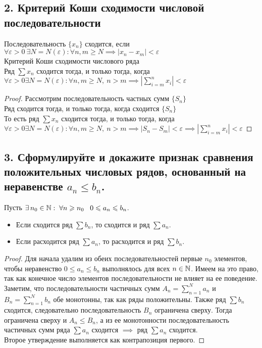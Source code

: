 \documentclass[a4paper, fleqn]{article}
\begin{document}
        \subsection*{2. Критерий Коши сходимости числовой последовательности}
        Последовательность $\{x_n\}$ сходится, если $\forall \varepsilon > 0\ \exists N = N(\varepsilon) : \forall n, m \geqslant N \implies |x_n - x_m| < \varepsilon$\\
        Критерий Коши сходимости числового ряда\\
        Ряд $\sum x_n$ сходится тогда, и только тогда, когда $\forall\varepsilon > 0 \exists N = N(\varepsilon) : \forall n, m \geqslant N,\ n > m \implies |\sum\limits_{i = m}^n x_i| < \varepsilon$
\begin{proof}
        Рассмотрим последовательность частных сумм $\{S_n\}$\\
        Ряд сходится тогда, и только тогда, когда сходится $\{S_n\}$\\
        То есть ряд $\sum x_n$ сходится тогда, и только тогда, когда $\forall \varepsilon > 0 \exists N = N(\varepsilon) : \forall n, m \geqslant N,\ n > m \implies |S_n - S_m| < \varepsilon \implies |\sum\limits_{i = m}^n x_i| < \varepsilon$
\end{proof}

    \subsection*{3. Сформулируйте и докажите признак сравнения положительных числовых рядов, основанный на неравенстве $a_n \leqslant b_n$.}

    Пусть $\exists \, n_0 \in \mathbb{N} : \; \forall n \geqslant n_0 \;\;\; 0 \leqslant a_n \leqslant b_n$.

    \begin{itemize}
        \item Если сходится ряд $\sum b_n$, то сходится и ряд $\sum a_n$.
        \item Если расходится ряд $\sum a_n$, то расходится и ряд $\sum b_n$.
    \end{itemize}

    \begin{proof}
        Для начала удалим из обеих последовательностей первые $n_0$ элементов, чтобы неравенство $0 \leqslant a_n \leqslant b_n$ выполнялось для всех 
    $n \in \mathbb{N}$. Имеем на это право, так как конечное число элементов последовательности не влияет на ее поведение.
        \\[6 pt]
        Заметим, что последовательности частичных сумм $A_n = \sum \limits_{n = 1}^N a_n$ и $B_n = \sum \limits_{n = 1}^N b_n$ обе монотонны, так как
    ряды положительны. Также ряд $\sum b_n$ сходится, следовательно последовательность $B_n$ ограничена сверху. Тогда ограничена сверху и
    $A_n \leqslant B_n$, а из ее монотонности последовательность частичных сумм ряда $\sum a_n$ сходится $\implies$ ряд $\sum a_n$ сходится.
        \\[6 pt]
        Второе утверждение выполняется как контрапозиция первого.
    \end{proof}
    
\end{document}
